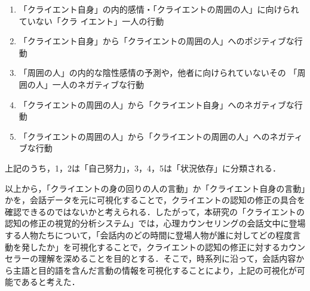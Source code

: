 \documentclass[shuuron]{kuee}
\begin{document}
\begin{enumerate}
  \item 「クライエント自身」の内的感情・「クライエントの周囲の人」に向けられていない「クラ
  イエント」一人の行動
  \item 「クライエント自身」から「クライエントの周囲の人」へのポジティブな行動


  \item 「周囲の人」の内的な陰性感情の予測や，他者に向けられていないその
  「周囲の人」一人のネガティブな行動
  \item 「クライエントの周囲の人」から「クライエント自身」へのネガティブな行動
  \item 「クライエントの周囲の人」から「クライエントの周囲の人」へのネガティブな行動

\end{enumerate}
上記のうち，1，2は「自己努力」，3，4，5は「状況依存」に分類される．

以上から，「クライエントの身の回りの人の言動」か「クライエント自身の言動」かを，会話データを元に可視化することで，クライエントの認知の修正の具合を確認できるのではないかと考えられる．したがって，本研究の「クライエントの認知の修正の視覚的分析システム」では，心理カウンセリングの会話文中に登場する人物たちについて，「会話内のどの時間に登場人物が誰に対してどの程度言動を発したか」を可視化することで，クライエントの認知の修正に対するカウンセラーの理解を深めることを目的とする．そこで，時系列に沿って，会話内容から主語と目的語を含んだ言動の情報を可視化することにより，上記の可視化が可能であると考えた．






%
%
%
%
\end{document}
